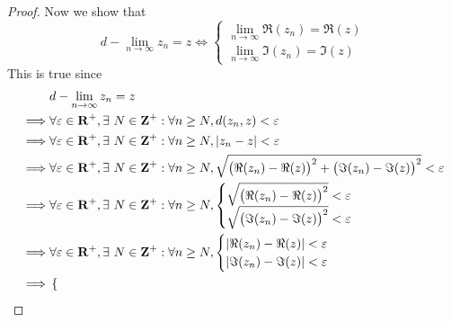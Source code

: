 \begin{proof}
  Now we show that
  \[
    d - \lim_{n \to \infty} z_n = z \iff \begin{cases}
      \lim_{n \to \infty} \Re(z_n) = \Re(z) \\
      \lim_{n \to \infty} \Im(z_n) = \Im(z)
    \end{cases}
  \]
  This is true since
  \begin{align*}
             & d - \lim_{n \to \infty} z_n = z                                                                                                                          \\
    \implies & \forall \varepsilon \in \mathbf{R}^+, \exists\ N \in \mathbf{Z}^+ : \forall n \geq N, d(z_n, z) < \varepsilon                                                            \\
    \implies & \forall \varepsilon \in \mathbf{R}^+, \exists\ N \in \mathbf{Z}^+ : \forall n \geq N, \left\lvert z_n - z\right\rvert < \varepsilon                                                        \\
    \implies & \forall \varepsilon \in \mathbf{R}^+, \exists\ N \in \mathbf{Z}^+ : \forall n \geq N, \sqrt{\big(\Re(z_n) - \Re(z)\big)^2 + \big(\Im(z_n) - \Im(z)\big)^2} < \varepsilon \\
    \implies & \forall \varepsilon \in \mathbf{R}^+, \exists\ N \in \mathbf{Z}^+ : \forall n \geq N, \begin{cases}
                                                                                       \sqrt{\big(\Re(z_n) - \Re(z)\big)^2} < \varepsilon \\
                                                                                       \sqrt{\big(\Im(z_n) - \Im(z)\big)^2} < \varepsilon
                                                                                     \end{cases}                                 \\
    \implies & \forall \varepsilon \in \mathbf{R}^+, \exists\ N \in \mathbf{Z}^+ : \forall n \geq N, \begin{cases}
                                                                                       \left\lvert\Re(z_n) - \Re(z)\right\rvert < \varepsilon \\
                                                                                       \left\lvert\Im(z_n) - \Im(z)\right\rvert < \varepsilon
                                                                                     \end{cases}                                              \\
    \implies & \begin{cases}

\end{cases}
\end{align*}
\end{proof}
